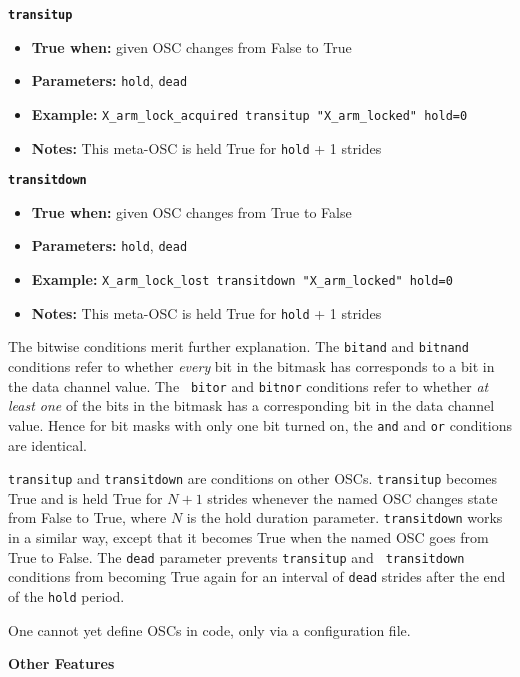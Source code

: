 {{\large\texttt{\textbf{transitup}}}

\begin{itemize}
\item \textbf{True when:} given OSC changes from False to True
\item \textbf{Parameters:} \texttt{hold}, \texttt{dead}
\item \textbf{Example:} \texttt{X\_arm\_lock\_acquired  transitup
    "X\_arm\_locked" hold=0}
\item \textbf{Notes:} This meta-OSC is held True for \texttt{hold} + 1 strides
\end{itemize}

{\large\texttt{\textbf{transitdown}}}

\begin{itemize}
\item \textbf{True when:} given OSC changes from True to False
\item \textbf{Parameters:} \texttt{hold}, \texttt{dead}
\item \textbf{Example:} \texttt{X\_arm\_lock\_lost  transitdown
    "X\_arm\_locked" hold=0}
\item \textbf{Notes:} This meta-OSC is held True for \texttt{hold} + 1 strides
\end{itemize}

The bitwise conditions merit further explanation. The \texttt{bitand} and
\texttt{bitnand} conditions refer to whether \textit{every} bit in the
bitmask has corresponds to a bit in the data channel value. The \texttt{
bitor} and \texttt{bitnor} conditions refer to whether \textit{at least one}
of the bits in the bitmask has a corresponding bit in the data channel
value. Hence for bit masks with only one bit turned on, the \texttt{and}
and \texttt{or} conditions are identical.

\texttt{transitup} and \texttt{transitdown} are conditions on other
OSCs. \texttt{transitup} becomes True and is held True for $N+1$ strides
whenever the named OSC changes state from False to True, where $N$ is
the hold duration parameter. \texttt{transitdown} works in a similar way,
except that it becomes True when the named OSC goes from True to
False.  The \texttt{dead} parameter prevents \texttt{transitup} and \texttt{
transitdown} conditions from becoming True again for an interval of
\texttt{dead} strides after the end of the \texttt{hold} period.

One cannot yet define OSCs in code, only via a configuration file.


\begin{center}
  \textbf{{\large Other Features}}
\end{center}

}
